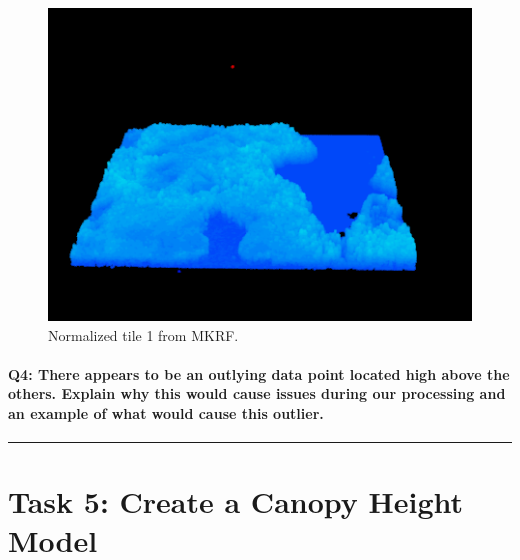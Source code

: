 \documentclass[
]{book}
\begin{document}
\begin{figure}

{\centering \includegraphics[width=1\linewidth]{images/03-normalized-tile-mkrf} 

}

\caption{Normalized tile 1 from MKRF.}\label{fig:03-normalized-tile-mkrf}
\end{figure}

\hypertarget{q4-there-appears-to-be-an-outlying-data-point-located-high-above-the-others.-explain-why-this-would-cause-issues-during-our-processing-and-an-example-of-what-would-cause-this-outlier.}{%
\paragraph*{Q4: There appears to be an outlying data point located high above the others. Explain why this would cause issues during our processing and an example of what would cause this outlier.}\label{q4-there-appears-to-be-an-outlying-data-point-located-high-above-the-others.-explain-why-this-would-cause-issues-during-our-processing-and-an-example-of-what-would-cause-this-outlier.}}

\begin{center}\rule{0.5\linewidth}{0.5pt}\end{center}

\hypertarget{task-5-create-a-canopy-height-model}{%
\section*{Task 5: Create a Canopy Height Model}\label{task-5-create-a-canopy-height-model}}
\end{document}
